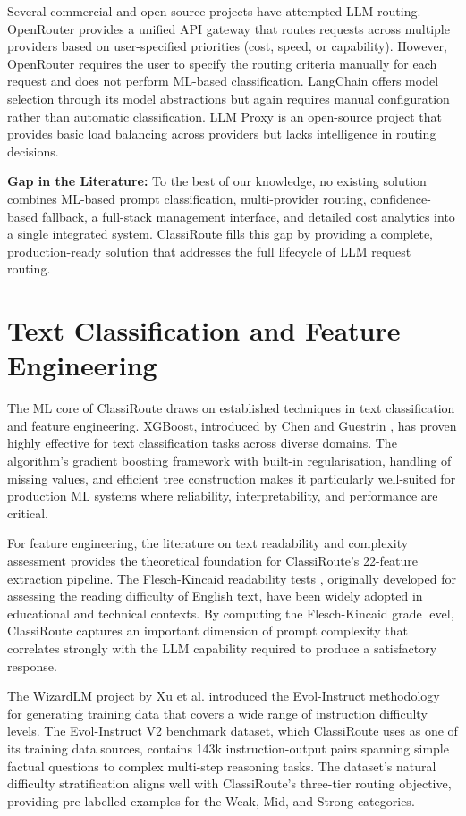 \documentclass[oneside,12pt,a4paper]{report}
\begin{document}
Several commercial and open-source projects have attempted LLM routing. OpenRouter provides a unified API gateway that routes requests across multiple providers based on user-specified priorities (cost, speed, or capability). However, OpenRouter requires the user to specify the routing criteria manually for each request and does not perform ML-based classification. LangChain offers model selection through its model abstractions but again requires manual configuration rather than automatic classification. LLM Proxy is an open-source project that provides basic load balancing across providers but lacks intelligence in routing decisions.

\textbf{Gap in the Literature:} To the best of our knowledge, no existing solution combines ML-based prompt classification, multi-provider routing, confidence-based fallback, a full-stack management interface, and detailed cost analytics into a single integrated system. ClassiRoute fills this gap by providing a complete, production-ready solution that addresses the full lifecycle of LLM request routing.

\section{Text Classification and Feature Engineering}

The ML core of ClassiRoute draws on established techniques in text classification and feature engineering. XGBoost, introduced by Chen and Guestrin \cite{xgboost}, has proven highly effective for text classification tasks across diverse domains. The algorithm's gradient boosting framework with built-in regularisation, handling of missing values, and efficient tree construction makes it particularly well-suited for production ML systems where reliability, interpretability, and performance are critical.

For feature engineering, the literature on text readability and complexity assessment provides the theoretical foundation for ClassiRoute's 22-feature extraction pipeline. The Flesch-Kincaid readability tests \cite{flesch1948readability}, originally developed for assessing the reading difficulty of English text, have been widely adopted in educational and technical contexts. By computing the Flesch-Kincaid grade level, ClassiRoute captures an important dimension of prompt complexity that correlates strongly with the LLM capability required to produce a satisfactory response.

The WizardLM project by Xu et al. \cite{zhou2023wizardlm} introduced the Evol-Instruct methodology for generating training data that covers a wide range of instruction difficulty levels. The Evol-Instruct V2 benchmark dataset, which ClassiRoute uses as one of its training data sources, contains 143k instruction-output pairs spanning simple factual questions to complex multi-step reasoning tasks. The dataset's natural difficulty stratification aligns well with ClassiRoute's three-tier routing objective, providing pre-labelled examples for the Weak, Mid, and Strong categories.
\end{document}
